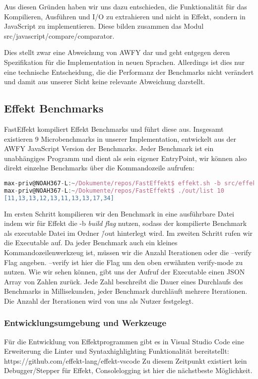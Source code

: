 Aus diesen Gründen haben wir uns dazu entschieden, die Funktionalität für das Kompilieren, Ausführen und I/O zu extrahieren und nicht in Effekt, sondern in JavaScript zu implementieren. Diese bilden zusammen das Modul src/javascript/compare/comparator.

Dies stellt zwar eine Abweichung von AWFY dar und geht entgegen deren Spezifikation für die Implementation in neuen Sprachen. Allerdings ist dies nur eine technische Entscheidung, die die Performanz der Benchmarks nicht verändert und damit aus unserer Sicht keine relevante Abweichung darstellt.

\subsection{Effekt Benchmarks}
FastEffekt kompiliert Effekt Benchmarks und führt diese aus. Insgesamt existieren 9 Microbenchmarks in unserer Implementation, entwickelt aus der AWFY JavaScript Version der Benchmarks.
Jeder Benchmark ist ein unabhängiges Programm und dient als sein eigener EntryPoint, wir können also direkt einzelne Benchmarks über die Kommandozeile aufrufen:

\begin{lstlisting}[language=javascript]
max-priv@NOAH367-L:~/Dokumente/repos/FastEffekt$ effekt.sh -b src/effekt/benchmark/list.effekt 
max-priv@NOAH367-L:~/Dokumente/repos/FastEffekt$ ./out/list 10
[11,13,13,12,13,11,13,13,17,34]
\end{lstlisting}

Im ersten Schritt kompilieren wir den Benchmark in eine ausführbare Datei indem wir für Effekt die -b \textit{build flag} nutzen, sodass der kompilierte Benchmark als executable Datei im Ordner \./out hinterlegt wird. Im zweiten Schritt rufen wir die Executable auf. Da jeder Benchmark auch ein kleines Kommandozeilenwerkzeug ist, müssen wir die Anzahl Iterationen oder die --verify Flag angeben. --verify ist hier die Flag um den %
oben erwähnten verify-mode zu nutzen.
Wie wir sehen können, gibt uns der Aufruf der Executable einen JSON Array von Zahlen zurück. Jede Zahl beschreibt die Dauer eines Durchlaufs des Benchmarks in Millisekunden, jeder Benchmark durchläuft mehrere Iterationen. Die Anzahl der Iterationen wird von uns als Nutzer festgelegt.

\subsubsection{Entwicklungsumgebung und Werkzeuge}
Für die Entwicklung von Effektprogrammen gibt es in Visual Studio Code eine Erweiterung die Linter und Syntaxhighlighting Funktionalität bereitstellt:
https://github.com/effekt-lang/effekt-vscode
Zu diesem Zeitpunkt existiert kein Debugger/Stepper für Effekt, Consolelogging ist hier die nächstbeste Möglichkeit.

